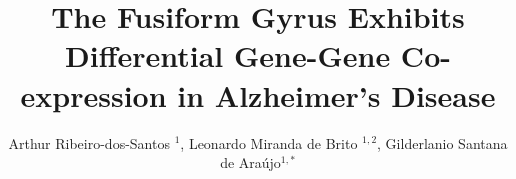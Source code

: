 \documentclass[utf8]{FrontiersinHarvard} %
\def\firstAuthorLast{Ribeiro-dos-Santos, A. {et~al.}}
\def\Authors{Arthur Ribeiro-dos-Santos $^{1}$, Leonardo Miranda de Brito $^{1,2}$, Gilderlanio Santana de Araújo$^{1,*}$}
\begin{document}
\onecolumn
{}

\title[Differential Gene-Gene Co-expression in Alzheimer's Disease]{The Fusiform Gyrus Exhibits Differential Gene-Gene Co-expression in Alzheimer's Disease} 

\author[\firstAuthorLast ]{\Authors} %
\address{} %
\correspondance{} %

\extraAuth{}%


\maketitle
\end{document}
